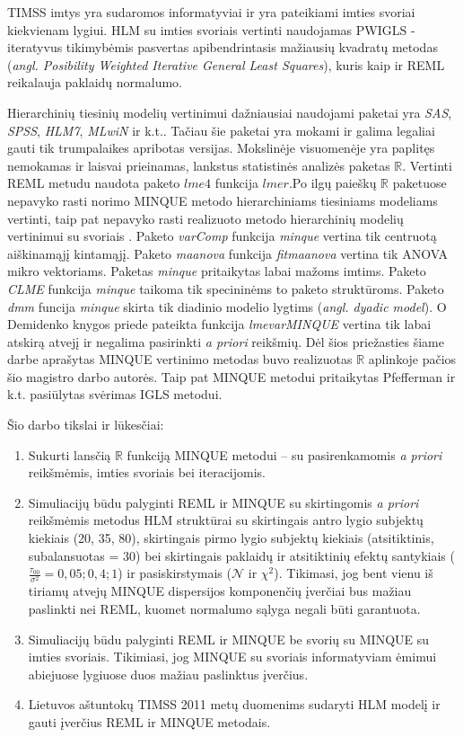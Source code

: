 \documentclass[12pt,a4paper]{article}
\newcommand{\R}{{\mathbb R}}
\begin{document}
\indent TIMSS imtys yra sudaromos informatyviai ir yra pateikiami imties svoriai kiekvienam lygiui\cite{2011Sample}. HLM su imties svoriais vertinti naudojamas PWIGLS - iteratyvus tikimybėmis pasvertas apibendrintasis mažiausių kvadratų metodas (\textit{angl. Posibility Weighted Iterative General Least Squares}), kuris kaip ir REML reikalauja paklaidų normalumo.

\indent Hierarchinių tiesinių modelių vertinimui dažniausiai naudojami paketai yra \textit{SAS}, \textit{SPSS}, \textit{HLM7}, \textit{MLwiN} ir k.t.. Tačiau šie paketai yra mokami ir galima legaliai gauti tik trumpalaikes apribotas versijas. Mokslinėje visuomenėje yra paplitęs nemokamas ir laisvai prieinamas, lankstus statistinės analizės paketas $\R$. Vertinti REML metudu naudota paketo $lme4$ funkcija $lmer$.Po ilgų paieškų $\R$ paketuose nepavyko rasti norimo MINQUE metodo hierarchiniams tiesiniams modeliams vertinti, taip pat nepavyko rasti realizuoto metodo hierarchinių modelių vertinimui su svoriais . Paketo \textit{varComp} funkcija \textit{minque} vertina tik centruotą aiškinamąjį kintamąjį. Paketo \textit{maanova} funkcija \textit{fitmaanova} vertina tik ANOVA mikro vektoriams. Paketas \textit{minque} pritaikytas labai mažoms imtims. Paketo \textit{CLME} funkcija \textit{minque} taikoma tik specininėms to paketo struktūroms. Paketo \textit{dmm} funcija \textit{minque} skirta  tik diadinio modelio lygtims (\textit{angl. dyadic model}). O Demidenko knygos \cite{mixedR} priede pateikta funkcija \textit{lmevarMINQUE} vertina tik labai atskirą atvejį ir negalima pasirinkti \textit{a priori} reikšmių. Dėl šios priežasties šiame darbe aprašytas MINQUE vertinimo metodas buvo realizuotas $\R$ aplinkoje pačios šio magistro darbo autorės. Taip pat MINQUE metodui pritaikytas Pfefferman ir k.t.\cite{pfeff} pasiūlytas svėrimas IGLS metodui.

\indent Šio darbo tikslai ir lūkesčiai:
\begin{enumerate}
\item Sukurti lansčią $\R$ funkciją MINQUE metodui -- su pasirenkamomis \textit{a priori} reikšmėmis,  imties svoriais bei iteracijomis.
\item Simuliacijų būdu palyginti REML ir MINQUE su skirtingomis \textit{a priori} reikšmėmis metodus HLM struktūrai su skirtingais antro lygio subjektų kiekiais (20, 35, 80), skirtingais pirmo lygio subjektų kiekiais (atsitiktinis, subalansuotas = 30) bei skirtingais paklaidų ir atsitiktinių efektų santykiais ($\frac{\tau_{00}}{\sigma^2}=0,05;0,4;1$) ir pasiskirstymais ($\mathcal{N}$ ir $\chi^2$). Tikimasi, jog bent vienu iš tiriamų atvejų MINQUE dispersijos komponenčių įverčiai bus mažiau paslinkti nei REML, kuomet normalumo sąlyga negali būti garantuota.
\item Simuliacijų būdu palyginti REML ir MINQUE be svorių su MINQUE su imties svoriais. Tikimiasi, jog MINQUE su svoriais informatyviam ėmimui abiejuose lygiuose duos mažiau paslinktus įverčius.
\item Lietuvos aštuntokų TIMSS 2011 metų duomenims sudaryti HLM modelį ir gauti įverčius REML ir MINQUE metodais.
\end{enumerate}
\end{document}
